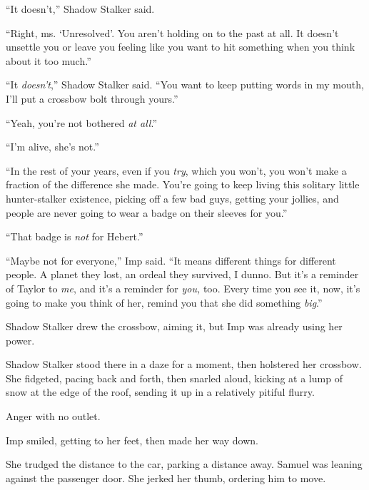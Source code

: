 ``It doesn't,'' Shadow Stalker said.



``Right, ms. `Unresolved'.  You aren't holding on to the past at all.  It doesn't unsettle you or leave you feeling like you want to hit something when you think about it too much.''



``It \emph{doesn't},'' Shadow Stalker said.  ``You want to keep putting words in my mouth, I'll put a crossbow bolt through yours.''



``Yeah, you're not bothered \emph{at all}.''



``I'm alive, she's not.''



``In the rest of your years, even if you \emph{try}, which you won't, you won't make a fraction of the difference she made.  You're going to keep living this solitary little hunter-stalker existence, picking off a few bad guys, getting your jollies, and people are never going to wear a badge on their sleeves for you.''



``That badge is \emph{not} for Hebert.''



``Maybe not for everyone,'' Imp said.  ``It means different things for different people.  A planet they lost, an ordeal they survived, I dunno.  But it's a reminder of Taylor to \emph{me}, and it's a reminder for \emph{you, }too.  Every time you see it, now, it's going to make you think of her, remind you that she did something \emph{big}.''



Shadow Stalker drew the crossbow, aiming it, but Imp was already using her power.



Shadow Stalker stood there in a daze for a moment, then holstered her crossbow.  She fidgeted, pacing back and forth, then snarled aloud, kicking at a lump of snow at the edge of the roof, sending it up in a relatively pitiful flurry.



Anger with no outlet.



Imp smiled, getting to her feet, then made her way down.



She trudged the distance to the car, parking a distance away.  Samuel was leaning against the passenger door.  She jerked her thumb, ordering him to move.



